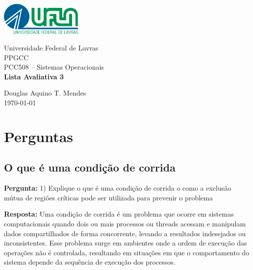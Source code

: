 \documentclass{article}
\begin{document}
\sloppy

\begin{titlepage}
    \centering
    \includegraphics[width=0.3\textwidth]{../../Topic1/Avaliativo/Imagens/Logo UFLA - Colorida chapada.png}

    \vspace*{2cm} %
    \Large
    Universidade Federal de Lavras\\
    PPGCC\\
    PCC508 – Sistemas Operacionais\\
    
    \vspace{2cm} %
    \huge %
    \textbf{Lista Avaliativa 3}
    
    \vfill %
    
    \large
    Douglas Aquino T. Mendes\\
    \today %
\end{titlepage}

\tableofcontents
\newpage

\section{Perguntas}
\subsection{O que é uma condição de corrida}
\textbf{Pergunta:} 1) Explique o que é uma condição de corrida o como a exclusão mútua de regiões críticas pode ser utilizada para prevenir o problema\newline

\textbf{Resposta:} Uma condição de corrida é um problema que ocorre em sistemas computacionais quando dois ou mais processos ou threads acessam e manipulam dados compartilhados de forma concorrente, levando a resultados indesejados ou inconsistentes. Esse problema surge em ambientes onde a ordem de execução das operações não é controlada, resultando em situações em que o comportamento do sistema depende da sequência de execução dos processos.
\end{document}
